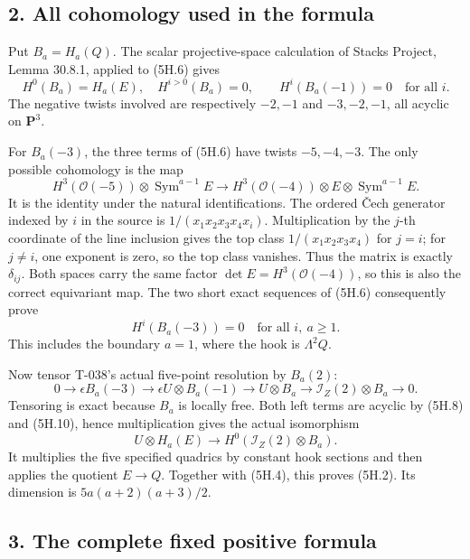 \documentclass[
  10pt,
]{article}
\begin{document}
\subsection{2. All cohomology used in the
formula}\label{all-cohomology-used-in-the-formula}

Put \(B_a=H_a(Q)\). The scalar projective-space calculation of Stacks
Project, Lemma 30.8.1, applied to (5H.6) gives \[
H^0(B_a)=H_a(E),\quad H^{i>0}(B_a)=0,
\qquad H^i(B_a(-1))=0\quad\text{for all }i.
\tag{5H.8}
\] The negative twists involved are respectively \(-2,-1\) and
\(-3,-2,-1\), all acyclic on \(\mathbf P^3\).

For \(B_a(-3)\), the three terms of (5H.6) have twists \(-5,-4,-3\). The
only possible cohomology is the map \[
H^3(\mathcal O(-5))\otimes\operatorname{Sym}^{a-1}E
\longrightarrow H^3(\mathcal O(-4))\otimes E
                                      \otimes\operatorname{Sym}^{a-1}E.
\tag{5H.9}
\] It is the identity under the natural identifications. The ordered
Čech generator indexed by \(i\) in the source is
\(1/(x_1x_2x_3x_4x_i)\). Multiplication by the \(j\)-th coordinate of
the line inclusion gives the top class \(1/(x_1x_2x_3x_4)\) for \(j=i\);
for \(j\ne i\), one exponent is zero, so the top class vanishes. Thus
the matrix is exactly \(\delta_{ij}\). Both spaces carry the same factor
\(\det E=H^3(\mathcal O(-4))\), so this is also the correct equivariant
map. The two short exact sequences of (5H.6) consequently prove \[
\boxed{H^i(B_a(-3))=0\quad\text{for all }i,\ a\ge1.}
\tag{5H.10}
\] This includes the boundary \(a=1\), where the hook is \(\Lambda^2Q\).

Now tensor T-038's actual five-point resolution by \(B_a(2)\): \[
0\to\epsilon B_a(-3)\to\epsilon U\otimes B_a(-1)
\to U\otimes B_a\to\mathcal I_Z(2)\otimes B_a\to0.
\tag{5H.11}
\] Tensoring is exact because \(B_a\) is locally free. Both left terms
are acyclic by (5H.8) and (5H.10), hence multiplication gives the actual
isomorphism \[
U\otimes H_a(E)\longrightarrow
H^0(\mathcal I_Z(2)\otimes B_a).
\tag{5H.12}
\] It multiplies the five specified quadrics by constant hook sections
and then applies the quotient \(E\to Q\). Together with (5H.4), this
proves (5H.2). Its dimension is \(5a(a+2)(a+3)/2\).

\subsection{3. The complete fixed positive
formula}\label{the-complete-fixed-positive-formula}
\end{document}
